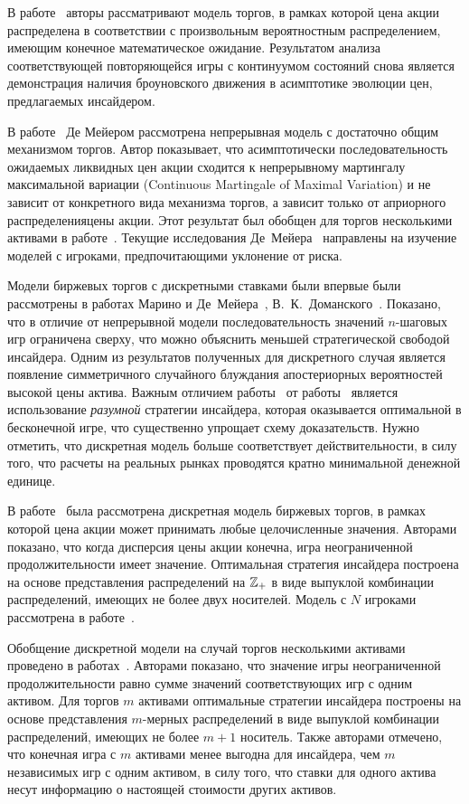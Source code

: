 В работе~\cite{demeyer02c} авторы рассматривают модель торгов, в рамках которой цена акции распределена в соответствии с произвольным вероятностным распределением, имеющим конечное математическое ожидание.
Результатом анализа соответствующей повторяющейся игры с континуумом состояний снова является демонстрация наличия броуновского движения в асимптотике эволюции цен, предлагаемых инсайдером.

В работе~\cite{demeyer10} Де Мейером рассмотрена непрерывная модель с достаточно общим механизмом торгов.
Автор показывает, что асимптотически последовательность ожидаемых ликвидных цен акции сходится к непрерывному мартингалу максимальной
вариации (Continuous Martingale of Maximal Variation) и не зависит от конкретного вида механизма торгов, а зависит только от априорного распределенияцены акции.
Этот результат был обобщен для торгов несколькими активами в работе~\cite{gensbittel15}.
Текущие исследования Де~Мейера~\cite{demeyer15} направлены на изучение моделей с игроками, предпочитающими уклонение от риска.

Модели биржевых торгов с дискретными ставками были впервые были рассмотрены в работах Марино и Де~Мейера~\cite{demeyer05}, В.~К.~Доманского~\cite{domansky07}.
Показано, что в отличие от непрерывной модели последовательность значений $n$-шаговых игр ограничена сверху, что можно объяснить меньшей стратегической свободой инсайдера.
Одним из результатов полученных для дискретного случая является появление симметричного случайного блуждания апостериорных вероятностей высокой цены актива.
Важным отличием работы~\cite{domansky07} от работы~\cite{demeyer05} является использование \emph{разумной} стратегии инсайдера, которая оказывается оптимальной в бесконечной игре, что существенно упрощает схему доказательств. 
Нужно отметить, что дискретная модель больше соответствует действительности, в силу того, что расчеты на реальных рынках проводятся кратно минимальной денежной единице.

В работе~\cite{domansky11} была рассмотрена дискретная модель биржевых торгов, в рамках которой цена акции может принимать любые целочисленные значения.
Авторами показано, что когда дисперсия цены акции конечна, игра неограниченной продолжительности имеет значение.
Оптимальная стратегия инсайдера построена на основе представления распределений на $\mathbb{Z}_+$ в виде выпуклой комбинации распределений, имеющих не более двух носителей.
Модель с $N$ игроками рассмотрена в работе~\cite{domansky08}.

Обобщение дискретной модели на случай торгов несколькими активами проведено в работах~\cite{domansky13, domansky14}.
Авторами показано, что значение игры неограниченной продолжительности равно сумме значений соответствующих игр с одним активом.
Для торгов $m$ активами оптимальные стратегии инсайдера построены на основе представления $m$-мерных распределений в виде выпуклой комбинации распределений, имеющих не более $m+1$ носитель.
Также авторами отмечено, что конечная игра с $m$ активами менее выгодна для инсайдера, чем $m$ независимых игр с одним активом, в силу того, что ставки для одного актива несут информацию о настоящей стоимости других активов.

